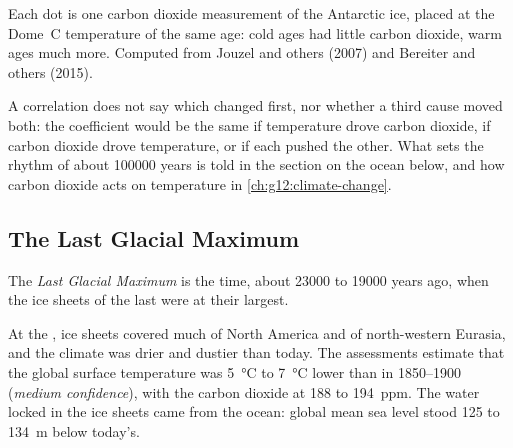 \begin{omfigure}

{\small Each dot is one carbon dioxide measurement of the Antarctic ice,
placed at the Dome~C temperature of the same age: cold ages had little carbon
dioxide, warm ages much more. Computed from Jouzel and others (2007) and
Bereiter and others (2015).}
\end{omfigure}

A correlation does not say which changed first, nor whether a third cause
moved both: the coefficient would be the same if temperature drove carbon
dioxide, if carbon dioxide drove temperature, or if each pushed the other.
What sets the rhythm of about \num{100000} years is told in the section on
the ocean below, and how carbon dioxide acts on temperature in
\cref{ch:g12:climate-change}.

\subsection{The Last Glacial Maximum}

\begin{definition}\label{def:g12:past-climates:lgm}
The \emph{Last Glacial Maximum} is the time, about
\num{23000} to \num{19000} years ago, when the ice sheets of the last  were at their largest.
\end{definition}

At the , ice sheets covered much of North America and of
north-western Eurasia, and the climate was drier and dustier than today. The
assessments estimate that the global surface temperature was \qty{5}{\degreeCelsius}
to \qty{7}{\degreeCelsius} lower than in 1850--1900 (\emph{medium confidence}),
with the carbon dioxide at 188 to \qty{194}{ppm}. The water locked in the ice
sheets came from the ocean: global mean sea level stood 125 to \qty{134}{m}
below today's.


